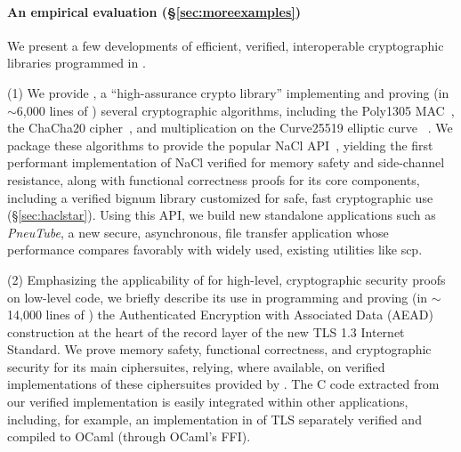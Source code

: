\paragraph*{An empirical evaluation (\S\ref{sec:moreexamples})}
We present a few developments of efficient, verified, interoperable
cryptographic libraries programmed in \lowstar.

(1) We provide \haclstar, a ``high-assurance crypto library''
implementing and proving (in $\sim$6,000 lines of \lowstar) several
cryptographic algorithms, including the Poly1305
MAC~\cite{bernstein2005poly1305}, the ChaCha20 cipher~\cite{chacha20},
and multiplication on the Curve25519 elliptic curve
~\cite{curve25519}.
%
We package these algorithms to provide the popular NaCl
API~\cite{bernstein2012security}, yielding the first performant
implementation of NaCl verified for memory safety and side-channel
resistance, along with functional correctness proofs for its core
components, including a verified bignum library customized for safe,
fast cryptographic use (\S\ref{sec:haclstar}).  
%
Using this API, we build new standalone applications such as
 \emph{PneuTube}, a new secure, asynchronous, file transfer 
application whose performance compares favorably with widely 
used, existing utilities like scp.

(2) Emphasizing the applicability of \lowstar for high-level,
cryptographic security proofs on low-level code, we briefly describe
its use in programming and proving (in $\sim$14,000 lines of \lowstar)
the Authenticated Encryption with Associated Data (AEAD) construction
at the heart of the record layer of the new TLS 1.3 Internet Standard.
%
We prove memory safety, functional correctness, and cryptographic
security for its main ciphersuites, relying, where available, on
verified implementations of these ciphersuites provided by \haclstar.
%
The C code extracted from our verified implementation is easily
integrated within other applications, including, for example, an
implementation in \fstar of TLS separately verified and compiled to
OCaml (through OCaml's FFI).




